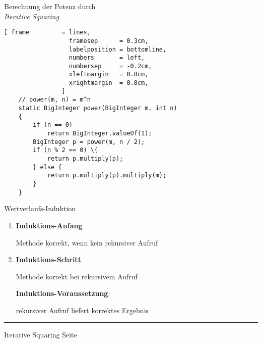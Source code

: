 \documentclass{slides}
\newcounter{mypage}
\begin{document}
\begin{slide}{}
\begin{center}
Berechnung der Potenz durch \\
\textsl{Iterative Squaring}
\end{center}

\footnotesize

\begin{Verbatim}[ frame         = lines, 
                  framesep      = 0.3cm, 
                  labelposition = bottomline,
                  numbers       = left,
                  numbersep     = -0.2cm,
                  xleftmargin   = 0.8cm,
                  xrightmargin  = 0.8cm,
                ]
    // power(m, n) = m^n
    static BigInteger power(BigInteger m, int n)
    {
        if (n == 0)
            return BigInteger.valueOf(1);
        BigInteger p = power(m, n / 2);
        if (n % 2 == 0) \{
            return p.multiply(p);
        } else {
            return p.multiply(p).multiply(m);
        }
    }
\end{Verbatim}

Wertverlaufs-Induktion
\begin{enumerate}

\item \textbf{Induktions-Anfang}

      Methode korrekt, wenn kein rekursiver Aufruf
\item \textbf{Induktions-Schritt}

      Methode korrekt bei rekursivem Aufruf

      \textbf{Induktions-Voraussetzung}:
  
      rekursiver Aufruf liefert korrektes Ergebnis
\end{enumerate}

\vspace*{\fill}
\tiny \addtocounter{mypage}{1}
\rule{17cm}{1mm}
Iterative Squaring \hspace*{\fill} Seite 
\end{slide}

\end{document}
